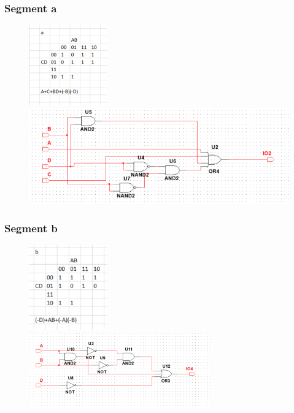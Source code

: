 \documentclass[12pt,a4paper]{article}
\begin{document}
\subsubsection{Segment a}
\begin{figure}[H]
\centering
\includegraphics[width=0.3\textwidth]{7seg/seg0}
\includegraphics[width=\textwidth]{7seg/seg0circ}
\end{figure}

\newpage
\subsubsection{Segment b}
\begin{figure}[H]
\centering
\includegraphics[width=0.3\textwidth]{7seg/seg1}
\includegraphics[width=0.7\textwidth]{7seg/seg1circ}
\end{figure}
\end{document}
